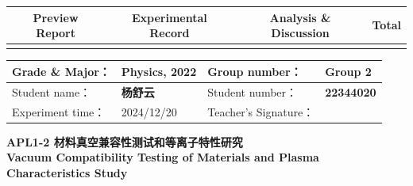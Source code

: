 


\begin{table}
	\renewcommand\arraystretch{1.7}
	\begin{tabularx}{\textwidth}{
			|X|X|X|X
			|X|X|X|X|}
		\hline
		\multicolumn{2}{|c|}{Preview Report}&\multicolumn{2}{|c|}{Experimental Record}&\multicolumn{2}{|c|}{Analysis \& Discussion}&\multicolumn{2}{|c|}{\Large\textbf{Total}}\\
		\hline
		\LARGE & & \LARGE & & \LARGE & & \LARGE & \\
		\hline
	\end{tabularx}
\end{table}


\begin{table}
	\renewcommand\arraystretch{1.7}
	\begin{tabularx}{\textwidth}{|X|X|X|X|}
		\hline
		Grade \& Major： & Physics, 2022 &Group number： & Group 2\\
		\hline
		Student name： & \textbf{杨舒云}  & Student number： & \textbf{22344020}\\
		\hline
		Experiment time： & 2024/12/20 & Teacher's Signature： & \\
		\hline
	\end{tabularx}
\end{table}


\begin{center}
	\huge \textbf{APL1-2 \quad 材料真空兼容性测试和等离子特性研究\\Vacuum Compatibility Testing of Materials and Plasma Characteristics Study}
\end{center}


